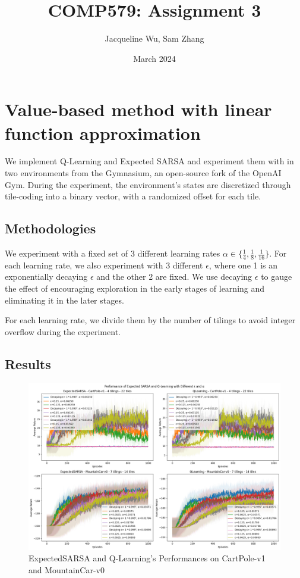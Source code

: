 \documentclass{article in the early stages}
\title{COMP579: Assignment 3}
\author{Jacqueline Wu, Sam Zhang}
\date{March 2024}
\begin{document}
\maketitle

\section{Value-based method with linear function approximation}
We implement Q-Learning and Expected SARSA and experiment them with in two environments from the Gymnasium, an open-source fork of the OpenAI Gym. \cite{gymnasium}
During the experiment, the environment's states are discretized through tile-coding into a binary vector, with a randomized offset for each tile.

\subsection{Methodologies}
We experiment with a fixed set of 3 different learning rates $\alpha \in \{ \frac{1}{4}, \frac{1}{8}, \frac{1}{16} \}$.
For each learning rate, we also experiment with 3 different $\epsilon$, where one 1 is an
exponentially decaying $\epsilon$ and the other 2 are fixed. We use decaying $\epsilon$ to
gauge the effect of encouraging exploration in the early stages of learning
and eliminating it in the later stages.

For each learning rate, we divide them by the number of tilings to avoid integer overflow during
the experiment.

\subsection{Results}

\begin{figure}[htbp]
    \centering
    \includegraphics[scale=0.37]{q1.png}
    \caption{ExpectedSARSA and Q-Learning's Performances on CartPole-v1 and MountainCar-v0}
    \label{fig:q1}
\end{figure}
\end{document}
